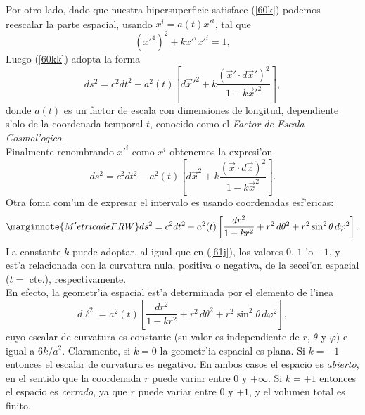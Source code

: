 Por otro lado, dado que nuestra hipersuperficie satisface (\ref{60k}) podemos reescalar la parte espacial, usando
$x^i=a(t)x'^{i}$,  tal que
\begin{equation}
(x'^{4})^{2} +kx'^{i}x'^{i}=1,
\end{equation}
Luego (\ref{60kk}) adopta la forma
\begin{equation}
ds^{2}= c^2dt^2 - a^{2}(t)\left[ d\vec{x}'^{2}+ k\frac{(\vec{x}'\cdot d\vec{x}')^{2}}{1-k\vec{x}'^{2}}\right],
\end{equation}
donde $a(t)$ es un factor de escala con dimensiones de longitud, dependiente s'olo de la coordenada temporal $t$, conocido
como el \textit{Factor de Escala Cosmol'ogico}.\\
Finalmente renombrando $x'^i$ como $x^i$ obtenemos la expresi'on
\begin{equation}
ds^{2}= c^2dt^2 - a^{2}(t)\left[ d\vec{x}^{2} + k\frac{(\vec{x}\cdot d\vec{x})^{2}}{1-k\vec{x}^{2}}\right].
\end{equation}
Otra foma com'un de expresar el intervalo es usando coordenadas esf'ericas:
\begin{equation}\marginnote{M'etrica de FRW}
 ds^2=c^2dt^2-a^2(t)\left[\frac{dr^2}{1-kr^2}+r^2\,d\theta^2+r^2\sin^2\theta\,d\varphi^2\right].\label{dsFRW}
\end{equation}
La constante $k$ puede adoptar, al igual que en (\ref{61j}), los valores $0$, $1$ 'o $-1$, y est'a relacionada con la curvatura nula, positiva o
negativa, de la secci'on espacial ($t=$ cte.), respectivamente.\\
En efecto, la geometr'ia espacial est'a determinada por el elemento de l'inea
\begin{equation}
 d\ell^2=a^2(t)\left[\frac{dr^2}{1-kr^2}+r^2\,d\theta^2+r^2\sin^2\theta\,d\varphi^2\right],
\end{equation}
cuyo escalar de curvatura es constante (su valor es independiente de $r$, $\theta$ y $\varphi$) e igual a $6k/a^2$.
Claramente, si $k=0$ la geometr'ia espacial es plana. Si $k=-1$ entonces el escalar de curvatura es negativo. En ambos 
casos el espacio es \textit{abierto}, en el sentido que la coordenada $r$ puede variar entre $0$ y $+\infty$. Si $k=+1$ 
entonces el espacio es \textit{cerrado}, ya que $r$ puede variar entre $0$ y $+1$, y el volumen total es finito.
